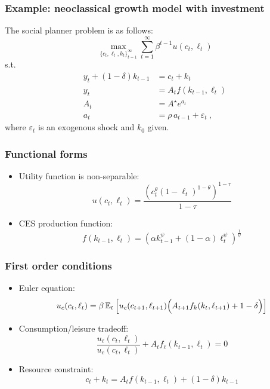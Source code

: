 \documentclass[handout,usepdftitle=false,xcolor=dvipsnames,aspectratio=169]{beamer}
\begin{document}
\begin{frame}
  \frametitle{Example: neoclassical growth model with investment}
  The social planner problem is as follows:
  \begin{equation}
    \label{eq:social-planner-problem:1}
    \max_{\{c_{t},\ell_{t},k_{t}\}_{t=1}^{\infty}}
    \sum_{t=1}^{\infty}\beta^{t-1}u(c_{t},\ell_{t})
  \end{equation}
  s.t.
  \begin{align}
    y_t + (1-\delta)k_{t-1} & = c_t + k_t                           \\
    y_t                     & = A_tf(k_{t-1},\ell_t)                \\
    A_{t}                   & = {A^{\star}}e^{a_{t}}                \\
    a_{t}                   & = \rho\, a_{t-1} + \varepsilon_t \: ,
  \end{align}
  where $\varepsilon_t$ is an exogenous shock and $k_0$ given.
\end{frame}

\begin{frame}
  \frametitle{Functional forms}
  \begin{itemize}
    \item Utility function is non-separable:
          \begin{equation}
            u(c_t,\ell_t) = \frac{\left(c_t^{\theta}(1-\ell_t)^{1-\theta}\right)^{1-\tau}}{1-\tau}
          \end{equation}

    \item CES production function:
          \begin{equation}
            f(k_{t-1},\ell_t) = \left(\alpha k_{t-1}^{\psi} + (1-\alpha)\ell_t^{\psi}\right)^{\frac{1}{\psi}}
          \end{equation}
  \end{itemize}
\end{frame}

\begin{frame}
  \frametitle{First order conditions}
  \begin{itemize}
    \item Euler equation:
          \begin{equation}
            u_c(c_t,\ell_t) = \beta\, \mathbb E_t\left[
              u_c(c_{t+1},\ell_{t+1})\Bigl(A_{t+1}f_k(k_t,\ell_{t+1}) + 1
              -\delta\Bigr) \right]
          \end{equation}
    \item Consumption/leisure tradeoff:
          \begin{equation}
            \frac{u_{\ell}(c_t,\ell_t)}{u_c(c_t,\ell_t)} + A_t f_{\ell}(k_{t-1},\ell_t) = 0
          \end{equation}
    \item Resource constraint:
          \begin{equation}
            c_t + k_t = A_tf(k_{t-1},\ell_t) + (1-\delta)k_{t-1}
          \end{equation}
  \end{itemize}
\end{frame}
\end{document}
